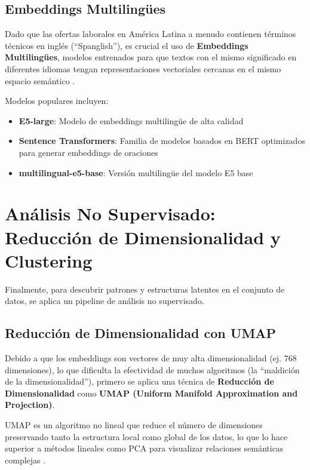 \subsection{Embeddings Multilingües}

Dado que las ofertas laborales en América Latina a menudo contienen términos técnicos en inglés (``Spanglish''), es crucial el uso de \textbf{Embeddings Multilingües}, modelos entrenados para que textos con el mismo significado en diferentes idiomas tengan representaciones vectoriales cercanas en el mismo espacio semántico \cite{echeverria2022, kavas2024}.

Modelos populares incluyen:

\begin{itemize}
    \item \textbf{E5-large}: Modelo de embeddings multilingüe de alta calidad
    \item \textbf{Sentence Transformers}: Familia de modelos basados en BERT optimizados para generar embeddings de oraciones
    \item \textbf{multilingual-e5-base}: Versión multilingüe del modelo E5 base
\end{itemize}

\section{Análisis No Supervisado: Reducción de Dimensionalidad y Clustering}

Finalmente, para descubrir patrones y estructuras latentes en el conjunto de datos, se aplica un pipeline de análisis no supervisado.

\subsection{Reducción de Dimensionalidad con UMAP}

Debido a que los embeddings son vectores de muy alta dimensionalidad (ej. 768 dimensiones), lo que dificulta la efectividad de muchos algoritmos (la ``maldición de la dimensionalidad''), primero se aplica una técnica de \textbf{Reducción de Dimensionalidad} como \textbf{UMAP (Uniform Manifold Approximation and Projection)}.

UMAP es un algoritmo no lineal que reduce el número de dimensiones preservando tanto la estructura local como global de los datos, lo que lo hace superior a métodos lineales como PCA para visualizar relaciones semánticas complejas \cite{lukauskas2023}.

